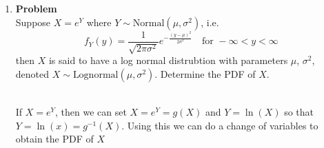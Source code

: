 \documentclass[12pt]{article}
\newenvironment{Ex}{\textbf{Problem}\vspace{.75em}\\}{}
\newcommand{\dd}[1]{\:\mathrm{d}{#1}}
\begin{document}
\begin{enumerate}
\begin{Ex}
\begin{solution}
\begin{enumerate}
\begin{equation}
          \label{eq:4b-sol}
          \begin{aligned}
            \text{Var}(T) &= E[T^2] - E[T]^2 \\
            \implies \text{Var}(T) &=
            \sum_{i=1}^{n} \frac{2 p_i}{\alpha_i^2}
            - \left(\sum_{i=1}^{n} \frac{p_i}{\alpha_i}\right)^2
          \end{aligned}
        \end{equation}
      \item Bayes' Rule, for reference, is as follows
        \begin{equation}
          \label{eq:4c-bayes-rule}
          P(A_i|B) = \frac{P(A_i)P(B|A_i)}{P(A_1)P(B|A_1) + \cdots +
            P(A_n)P(B|A_n)}
        \end{equation}
        Using this definition, we can define the probability that
        clerk $i$ served the customer given that $T>5$ as the
        following
        \begin{equation}
          \label{eq:4c-bayes-plug}
          \implies P(I=i|T>5) =
          \frac{p_i\int_5^{\infty}\alpha_ie^{-\alpha_i t}
            \dd{t}}{\sum_{j=1}^{n}p_j\int_5^{\infty}\alpha_je^{-\alpha_j
              t} \dd{t}}
        \end{equation}
      \end{enumerate}
    \end{solution}
  \end{Ex}
\item
  \begin{Ex}
    Suppose $X = e^Y$ where $Y\sim \text{Normal}(\mu, \sigma^2)$, i.e.
    \begin{equation}
      \label{eq:5-question}
      f_Y(y) =
      \frac{1}{\sqrt{2\pi\sigma^2}}e^{-\frac{(y-\mu)^2}{2\sigma^2}}
      \quad\text{for }-\infty < y < \infty
    \end{equation}
    then $X$ is said to have a log normal distrubtion with parameters
    $\mu$, $\sigma^2$, denoted $X \sim
    \text{Lognormal}(\mu,\sigma^2)$. Determine the PDF of $X$.
    \begin{solution} \hfill \vspace{.75em} \\
      If $X = e^Y$, then we can set $X = e^Y = g(X)$ and $Y=\ln(X)$ so
      that $Y = \ln(x) = g^{-1}(X)$. Using this we can do a change of
      variables to obtain the PDF of $X$
      \begin{equation}
        \label{eq:5-sol}
        \begin{aligned}

\end{aligned}
\end{equation}
\end{solution}
\end{Ex}
\end{enumerate}
\end{document}
